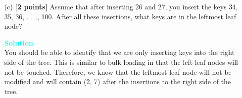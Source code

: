 \documentclass[10pt]{article}
\newenvironment{solution}
    { \begin{mdframed}[backgroundcolor=gray!10] \textcolor{cyan}{\textbf{Solution}} \\}
    {  \end{mdframed}}
\begin{document}
\begin{enumerate}
\begin{itemize}
		      \item[(c)] \textbf{[2 points]} Assume that after inserting 26 and 27, you insert the keys 34, 35, 36, . . ., 100. After all these
		            insertions, what keys are in the leftmost leaf node?
		            \begin{solution}
			            You should be able to identify that we are only inserting keys into the right side of the
			            tree. This is similar to bulk loading in that the left leaf nodes will not be touched. Therefore, we
			            know that the leftmost leaf node will not be modified and will contain (2, 7) after the insertions to
			            the right side of the tree.
		            \end{solution}
	      \end{itemize}
\end{enumerate}


\newpage
\end{document}
